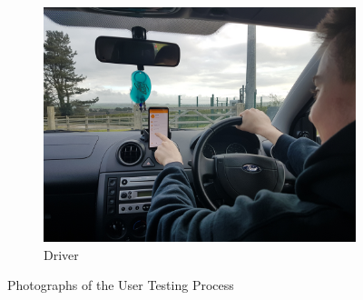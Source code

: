\begin{figure}[!h]
\begin{subfigure}[b]{0.6\linewidth}
		\includegraphics[width=\linewidth]{Resources/img/user_test_driver.jpg}
		\caption{Driver}
	\end{subfigure}
	\caption{Photographs of the User Testing Process}
	\label{fig:user_testing}
\end{figure}